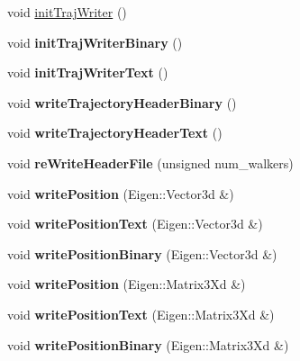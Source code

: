 \textbf{ }\par
\begin{DoxyCompactItemize}
\item 
void \hyperlink{class_trajectory_aec9f75fa04452af2199888c47652c7e4}{init\+Traj\+Writer} ()
\item 
\mbox{\label{class_trajectory_a661b8c4070a55fd2e6abe703d23c95df}} 
void {\bfseries init\+Traj\+Writer\+Binary} ()
\item 
\mbox{\label{class_trajectory_a7b6926793185fc0ebebb09a7abba8b7a}} 
void {\bfseries init\+Traj\+Writer\+Text} ()
\item 
\mbox{\label{class_trajectory_a0cf9e0365b4d075d2da7c800fef83858}} 
void {\bfseries write\+Trajectory\+Header\+Binary} ()
\item 
\mbox{\label{class_trajectory_ae84e1c1573c8f42bd68c09dff3909f6f}} 
void {\bfseries write\+Trajectory\+Header\+Text} ()
\item 
\mbox{\label{class_trajectory_a82540862cb8c200b1a6979b5f919681d}} 
void {\bfseries re\+Write\+Header\+File} (unsigned num\+\_\+walkers)
\item 
\mbox{\label{class_trajectory_ada4c4918a46c69508e6e847e4ef54f56}} 
void {\bfseries write\+Position} (Eigen\+::\+Vector3d \&)
\item 
\mbox{\label{class_trajectory_ad35ef554146d54b4ea0a3bdce1f6246d}} 
void {\bfseries write\+Position\+Text} (Eigen\+::\+Vector3d \&)
\item 
\mbox{\label{class_trajectory_a8ab6682b6a6c9cdc78fb6cef56129c91}} 
void {\bfseries write\+Position\+Binary} (Eigen\+::\+Vector3d \&)
\item 
\mbox{\label{class_trajectory_a5392bbab8cb315fcb99d30c90ca746b1}} 
void {\bfseries write\+Position} (Eigen\+::\+Matrix3\+Xd \&)
\item 
\mbox{\label{class_trajectory_a85776d999a5eacdbbef9008f96da007b}} 
void {\bfseries write\+Position\+Text} (Eigen\+::\+Matrix3\+Xd \&)
\item 
\mbox{\label{class_trajectory_a0c8e6a22d330cfdb6419813ffd43ccba}} 
void {\bfseries write\+Position\+Binary} (Eigen\+::\+Matrix3\+Xd \&)
\end{DoxyCompactItemize}

